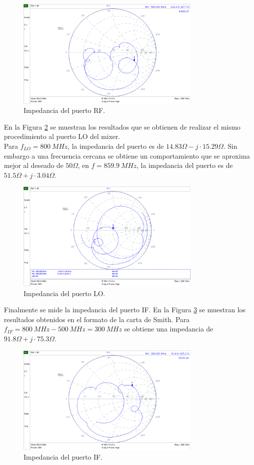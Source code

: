 \documentclass[a4paper,10pt]{article}
\begin{document}
	\begin{figure}[!htb]
		\centering
		\includegraphics[width=9cm]{Images/impRFvieja.png}
		\caption{Impedancia del puerto RF.}
		\label{impedancia1fran}
	\end{figure}
	
	\indent En la Figura \ref{impedancia2fran} se muestran los resultados que se
	obtienen de realizar el mismo procedimiento al puerto LO del mixer. \\ 
	\indent Para $f_{LO}=800~MHz$, la impedancia del puerto es de 
	$14.83\Omega-j\cdot15.29\Omega$. Sin embargo a una frecuencia cercana se 
	obtiene un comportamiento que se aproxima mejor al deseado de $50\Omega$, en
	$f=859.9~MHz$, la impedancia del puerto es de $51.5\Omega+j\cdot3.04\Omega$.
	
	\begin{figure}[!htb]
		\centering
		\includegraphics[width=9cm]{Images/impLOvieja.png}
		\caption{Impedancia del puerto LO.}
		\label{impedancia2fran}		
	\end{figure}

	\indent Finalmente se mide la impedancia del puerto IF. En la Figura 
	\ref{impedancia3fran} se muestran los resultados obtenidos en el formato de 
	la carta de Smith. Para $f_{IF}=800~MHz-500~MHz=300~MHz$ se obtiene una 
	impedancia de $91.8\Omega+j\cdot75.3\Omega$.
	
	\begin{figure}[!htb]
		\centering
		\includegraphics[width=9cm]{Images/impIFvieja.png}
		\caption{Impedancia del puerto IF.}
		\label{impedancia3fran}
	\end{figure}			
	
\end{document}
